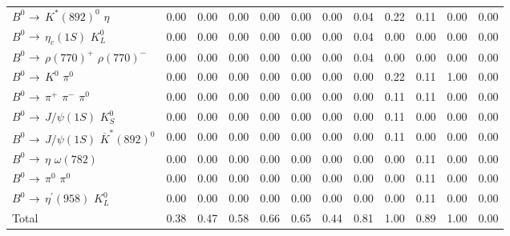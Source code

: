 {\begin{tabular}{lrrrrrrrrrrr}
$B^{0}$ $\rightarrow$ $K^{*}(892)^{0}$ $\eta$                   &         0.00 &         0.00 &         0.00 &         0.00 &         0.00 &         0.00 &         0.04 &         0.22 &         0.11 &         0.00 &         0.00 \\
$B^{0}$ $\rightarrow$ $\eta_{c}(1S)$ $K_{L}^{0}$                &         0.00 &         0.00 &         0.00 &         0.00 &         0.00 &         0.00 &         0.04 &         0.00 &         0.00 &         0.00 &         0.00 \\
$B^{0}$ $\rightarrow$ $\rho(770)^{+}$ $\rho(770)^{-}$           &         0.00 &         0.00 &         0.00 &         0.00 &         0.00 &         0.00 &         0.04 &         0.00 &         0.00 &         0.00 &         0.00 \\
$B^{0}$ $\rightarrow$ $K^{0}$ $\pi^{0}$                         &         0.00 &         0.00 &         0.00 &         0.00 &         0.00 &         0.00 &         0.00 &         0.22 &         0.11 &         1.00 &         0.00 \\
$B^{0}$ $\rightarrow$ $\pi^{+}$ $\pi^{-}$ $\pi^{0}$             &         0.00 &         0.00 &         0.00 &         0.00 &         0.00 &         0.00 &         0.00 &         0.11 &         0.11 &         0.00 &         0.00 \\
$B^{0}$ $\rightarrow$ $J/\psi(1S)$ $K_{S}^{0}$                  &         0.00 &         0.00 &         0.00 &         0.00 &         0.00 &         0.00 &         0.00 &         0.11 &         0.00 &         0.00 &         0.00 \\
$B^{0}$ $\rightarrow$ $J/\psi(1S)$ $\overline{K}^{*}(892)^{0}$  &         0.00 &         0.00 &         0.00 &         0.00 &         0.00 &         0.00 &         0.00 &         0.11 &         0.00 &         0.00 &         0.00 \\
$B^{0}$ $\rightarrow$ $\eta$ $\omega(782)$                      &         0.00 &         0.00 &         0.00 &         0.00 &         0.00 &         0.00 &         0.00 &         0.00 &         0.11 &         0.00 &         0.00 \\
$B^{0}$ $\rightarrow$ $\pi^{0}$ $\pi^{0}$                       &         0.00 &         0.00 &         0.00 &         0.00 &         0.00 &         0.00 &         0.00 &         0.00 &         0.11 &         0.00 &         0.00 \\
$B^{0}$ $\rightarrow$ $\eta^{\prime}(958)$ $K_{L}^{0}$          &         0.00 &         0.00 &         0.00 &         0.00 &         0.00 &         0.00 &         0.00 &         0.00 &         0.11 &         0.00 &         0.00 \\
Total                                                   &         0.38 &         0.47 &         0.58 &         0.66 &         0.65 &         0.44 &         0.81 &         1.00 &         0.89 &         1.00 &         0.00 \\
\hline
\end{tabular}
}